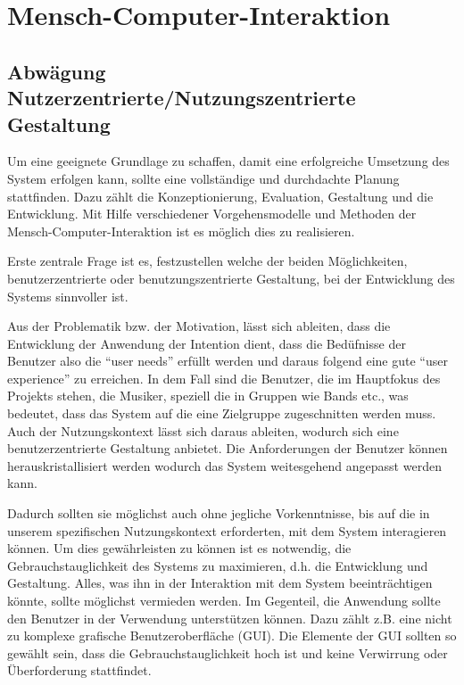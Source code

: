 \documentclass[12pt]{scrartcl}
\begin{document}






\section{Mensch-Computer-Interaktion}


\subsection{Abwägung Nutzerzentrierte/Nutzungszentrierte Gestaltung}
Um eine geeignete Grundlage zu schaffen, damit eine erfolgreiche Umsetzung des System erfolgen kann, sollte eine vollständige und durchdachte Planung stattfinden. Dazu zählt die Konzeptionierung, Evaluation, Gestaltung und die Entwicklung. 
Mit Hilfe verschiedener Vorgehensmodelle und Methoden der Mensch-Computer-Interaktion ist es möglich dies zu realisieren.

Erste zentrale Frage ist es, festzustellen welche der beiden Möglichkeiten, benutzerzentrierte oder benutzungszentrierte Gestaltung, bei der Entwicklung des Systems sinnvoller ist.

Aus der Problematik bzw. der Motivation, lässt sich ableiten, dass die Entwicklung der Anwendung der Intention dient, dass die Bedüfnisse der Benutzer also die “user needs” erfüllt werden und daraus folgend eine gute “user experience” zu erreichen. 
In dem Fall sind die Benutzer, die im Hauptfokus des Projekts stehen, die Musiker, speziell die in Gruppen wie Bands etc., was bedeutet, dass das System auf die eine Zielgruppe zugeschnitten werden muss. Auch der Nutzungskontext lässt sich daraus ableiten, wodurch sich eine benutzerzentrierte Gestaltung anbietet. Die Anforderungen der Benutzer können herauskristallisiert werden wodurch das System weitesgehend angepasst werden kann.

Dadurch sollten sie möglichst auch ohne jegliche Vorkenntnisse, bis auf die in unserem spezifischen Nutzungskontext erforderten, mit dem System interagieren können.
Um dies gewährleisten zu können ist es notwendig, die Gebrauchstauglichkeit des Systems zu maximieren, d.h. die Entwicklung und Gestaltung. Alles, was ihn in der Interaktion mit dem System beeinträchtigen könnte, sollte möglichst vermieden werden. Im Gegenteil, die Anwendung sollte den Benutzer in der Verwendung unterstützen können. Dazu zählt z.B. eine nicht zu komplexe grafische Benutzeroberfläche (GUI). Die Elemente der GUI sollten so gewählt sein, dass die Gebrauchstauglichkeit hoch ist und keine Verwirrung oder Überforderung stattfindet.
\end{document}
